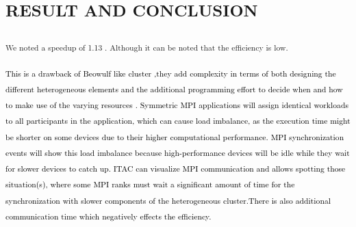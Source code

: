 \documentclass[a4paper]{article}
\newcommand\textstyleFootnoteSymbol[1]{\textsuperscript{#1}}
\begin{document}
\section[]{\color{black} }

\bigskip


\bigskip


\bigskip

\section[]{\color{black} }
\section[]{\color{black} }
\section[]{\color{black} }
\section[]{\color{black} }
\section[RESULT AND CONCLUSION]{\color{black} \textstyleFootnoteSymbol{RESULT AND CONCLUSION}}
{\color{black}
\textstyleFootnoteSymbol{We noted a speedup of 1.13 . Although it can be noted that the efficiency is low.}}

\textstyleFootnoteSymbol{\textcolor{black}{This is a drawback of
Be}\textcolor{black}{o}\textcolor{black}{w}\textcolor{black}{u}\textcolor{black}{lf }\textcolor{black}{like cluster
,}\textcolor{black}{t}\textcolor{black}{hey add complexity in terms of both designing the different heterogeneous
elements and the additional programming effort to decide when and how to make use of the varying resources . Symmetric
MPI applications will assign identical workloads to all participants in the application, which can cause load
imbalance, as the execution time might be shorter on some devices due to their higher computational performance. MPI
synchronization events will show this load imbalance because high-performance devices will be idle while they wait for
slower devices to catch up. ITAC can visualize MPI communication and allows spotting those situation(s), where some MPI
ranks must wait a significant amount of time for the synchronization with slower components of the heterogeneous
cluster.}\textcolor{black}{There is also additional communication time which negatively effects the efficiency.}}
\end{document}
